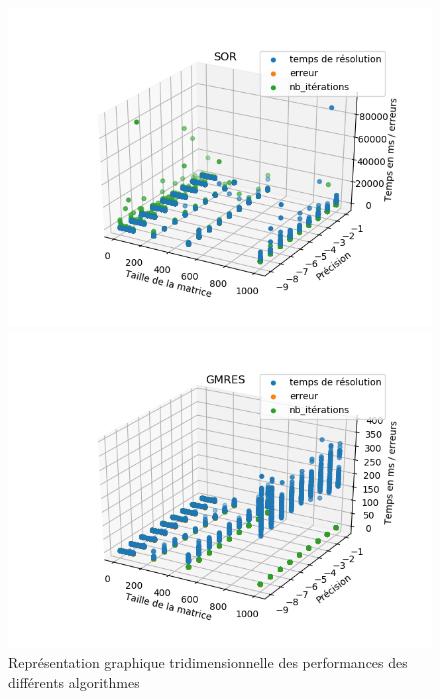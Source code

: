 \begin{figure}
\begin{minipage}[t]{0.5\linewidth}
	\includegraphics[width=\linewidth]{../codes/Data/sor3D.png}
	\end{minipage}
	\begin{minipage}[t]{0.5\linewidth}
	\includegraphics[width=\linewidth]{../codes/Data/gmres.png}
	\end{minipage}
	\caption{Représentation graphique tridimensionnelle des performances des différents algorithmes}
\end{figure}





